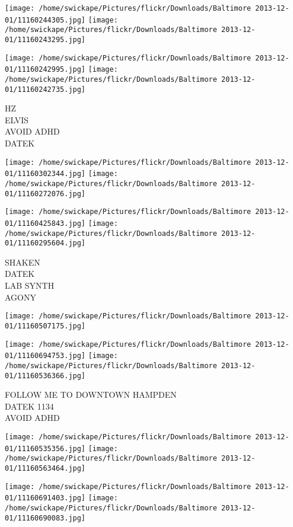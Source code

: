 \documentclass[10pt,letterpaper]{article}
\begin{document}
\texttt{[image: /home/swickape/Pictures/flickr/Downloads/Baltimore 2013-12-01/11160244305.jpg]}
\texttt{[image: /home/swickape/Pictures/flickr/Downloads/Baltimore 2013-12-01/11160243295.jpg]}

\texttt{[image: /home/swickape/Pictures/flickr/Downloads/Baltimore 2013-12-01/11160242995.jpg]}
\texttt{[image: /home/swickape/Pictures/flickr/Downloads/Baltimore 2013-12-01/11160242735.jpg]}

HZ\\
ELVIS\\
AVOID ADHD\\
DATEK
\pagebreak

\texttt{[image: /home/swickape/Pictures/flickr/Downloads/Baltimore 2013-12-01/11160302344.jpg]}
\texttt{[image: /home/swickape/Pictures/flickr/Downloads/Baltimore 2013-12-01/11160272076.jpg]}

\texttt{[image: /home/swickape/Pictures/flickr/Downloads/Baltimore 2013-12-01/11160425843.jpg]}
\texttt{[image: /home/swickape/Pictures/flickr/Downloads/Baltimore 2013-12-01/11160295604.jpg]}

SHAKEN\\
DATEK\\
LAB SYNTH\\
AGONY
\pagebreak

\texttt{[image: /home/swickape/Pictures/flickr/Downloads/Baltimore 2013-12-01/11160507175.jpg]}

\vspace{0.25in}
\texttt{[image: /home/swickape/Pictures/flickr/Downloads/Baltimore 2013-12-01/11160694753.jpg]}
\texttt{[image: /home/swickape/Pictures/flickr/Downloads/Baltimore 2013-12-01/11160536366.jpg]}

FOLLOW ME TO DOWNTOWN HAMPDEN\\
DATEK 1134\\
AVOID ADHD
\pagebreak

\texttt{[image: /home/swickape/Pictures/flickr/Downloads/Baltimore 2013-12-01/11160535356.jpg]}
\texttt{[image: /home/swickape/Pictures/flickr/Downloads/Baltimore 2013-12-01/11160563464.jpg]}

\texttt{[image: /home/swickape/Pictures/flickr/Downloads/Baltimore 2013-12-01/11160691403.jpg]}
\texttt{[image: /home/swickape/Pictures/flickr/Downloads/Baltimore 2013-12-01/11160690083.jpg]}
\end{document}

